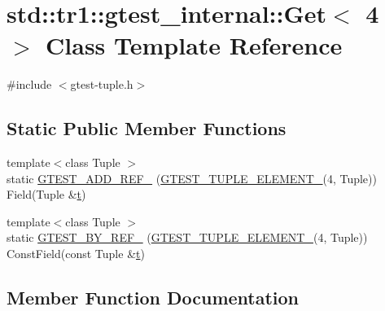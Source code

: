 \hypertarget{classstd_1_1tr1_1_1gtest__internal_1_1_get_3_014_01_4}{}\section{std\+::tr1\+::gtest\+\_\+internal\+::Get$<$ 4 $>$ Class Template Reference}
\label{classstd_1_1tr1_1_1gtest__internal_1_1_get_3_014_01_4}


{\ttfamily \#include $<$gtest-\/tuple.\+h$>$}

\subsection*{Static Public Member Functions}
\begin{DoxyCompactItemize}
\item 
{\footnotesize template$<$class Tuple $>$ }\\static \mbox{\hyperlink{classstd_1_1tr1_1_1gtest__internal_1_1_get_3_014_01_4_a5c7a91c681118bb7253e305f8ff42be4}{G\+T\+E\+S\+T\+\_\+\+A\+D\+D\+\_\+\+R\+E\+F\+\_\+}} (\mbox{\hyperlink{gtest-tuple_8h_a1b7f133d8aa02e0b7afed7b66781eeb7}{G\+T\+E\+S\+T\+\_\+\+T\+U\+P\+L\+E\+\_\+\+E\+L\+E\+M\+E\+N\+T\+\_\+}}(4, Tuple)) Field(Tuple \&\mbox{\hyperlink{_mutual_8h_a978d88b393c8a37dc2614c88788b3442}{t}})
\item 
{\footnotesize template$<$class Tuple $>$ }\\static \mbox{\hyperlink{classstd_1_1tr1_1_1gtest__internal_1_1_get_3_014_01_4_a04794c398bbe81e4de0915b79da2166a}{G\+T\+E\+S\+T\+\_\+\+B\+Y\+\_\+\+R\+E\+F\+\_\+}} (\mbox{\hyperlink{gtest-tuple_8h_a1b7f133d8aa02e0b7afed7b66781eeb7}{G\+T\+E\+S\+T\+\_\+\+T\+U\+P\+L\+E\+\_\+\+E\+L\+E\+M\+E\+N\+T\+\_\+}}(4, Tuple)) Const\+Field(const Tuple \&\mbox{\hyperlink{_mutual_8h_a978d88b393c8a37dc2614c88788b3442}{t}})
\end{DoxyCompactItemize}


\subsection{Member Function Documentation}
\mbox{\label{classstd_1_1tr1_1_1gtest__internal_1_1_get_3_014_01_4_a5c7a91c681118bb7253e305f8ff42be4}} 
